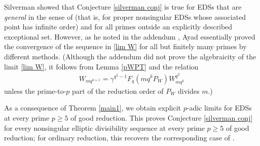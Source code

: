 \documentclass[11pt]{amsart}
\theoremstyle{definition}
\begin{document}
Silverman \cite[Theorem 20]{Si05a} showed that Conjecture \ref{silverman conj} is true for EDSs that are {\it general} in the sense of \cite{Si05a} (that is, for proper nonsingular EDSs whose associated point has infinite order) and for all primes outside an explicitly described exceptional set.
However, as he noted in the addendum \cite{Si05b}, Ayad \cite{Ay93} essentially proved the convergence of the sequence in \eqref{lim W} for all but finitely many primes by different methods.
(Although the addendum \cite{Si05b} did not prove the algebraicity of the limit \eqref{lim W}, it follows from Lemma \ref{pWPT} and the relation
%
\begin{align*}
W_{mq^{k+1}}=\gamma^{q^2-1}F_q(mq^kP_W)W_{mq^k}^{q^2}
\end{align*}
%
unless the prime-to-$p$ part of the reduction order of $P_W$ divides $m$.)

As a consequence of Theorem \ref{main1}, we obtain explicit $p$-adic limits for EDSs at every prime $p \geq 5$ of good reduction. This proves Conjecture \ref{silverman conj} for every nonsingular elliptic divisibility sequence at every prime $p \geq 5$ of good reduction; for ordinary reduction, this recovers the corresponding case of \cite[Theorem 20]{Si05a}.
\end{document}
